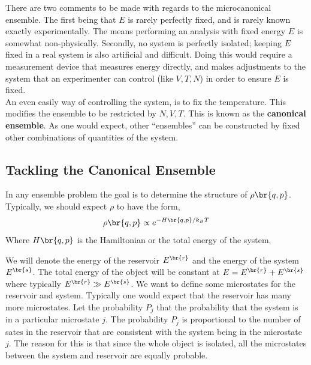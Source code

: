 \documentclass{article}
\begin{document}
There are two comments to be made with regards to the microcanonical ensemble. The first being that $E$ is rarely perfectly fixed, and is rarely known exactly experimentally. The means performing an analysis with fixed energy $E$ is somewhat non-physically. Secondly, no system is perfectly isolated; keeping $E$ fixed in a real system is also artificial and difficult. Doing this would require a measurement device that measures energy directly, and makes adjustments to the system that an experimenter can control (like $V, T, N$) in order to ensure $E$ is fixed. \\

An even easily way of controlling the system, is to fix the temperature. This modifies the ensemble to be restricted by $N, V, T$. This is known as the \textbf{canonical ensemble}. As one would expect, other ``ensembles'' can be constructed by fixed other combinations of quantities of the system.

\subsection{Tackling the Canonical Ensemble}
In any ensemble problem the goal is to determine the structure of $\rho\br{q,p}$. Typically, we should expect $\rho$ to have the form,
\[ \rho\br{q,p} \propto e^{-H\br{q,p}/k_BT} \]
Where $H\br{q,p}$ is the Hamiltonian or the total energy of the system.
\begin{center}
\end{center}

We will denote the energy of the reservoir $E^{\br{r}}$ and the energy of the system $E^{\br{s}}$. The total energy of the object will be constant at $E = E^{\br{r}} + E^{\br{s}}$ where typically $E^{\br{r}} \gg E^{\br{s}}$. We want to define some microstates for the reservoir and system. Typically one would expect that the reservoir has many more microstates. Let the probability $P_j$ that the probability that the system is in a particular microstate $j$. The probability $P_j$ is proportional to the number of sates in the reservoir that are consistent with the system being in the microstate $j$. The reason for this is that since the whole object is isolated, all the microstates between the system and reservoir are equally probable. \\
\end{document}
